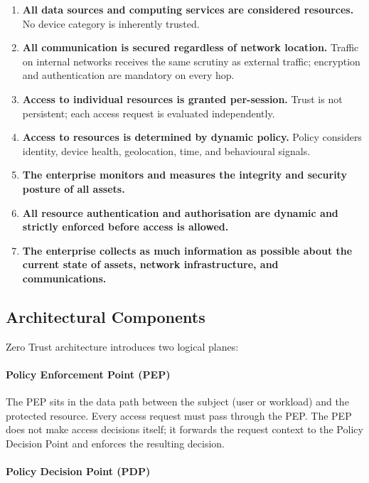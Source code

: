 \begin{enumerate}
    \item \textbf{All data sources and computing services are considered resources.} No device category is inherently trusted.
    \item \textbf{All communication is secured regardless of network location.} Traffic on internal networks receives the same scrutiny as external traffic; encryption and authentication are mandatory on every hop.
    \item \textbf{Access to individual resources is granted per-session.} Trust is not persistent; each access request is evaluated independently.
    \item \textbf{Access to resources is determined by dynamic policy.} Policy considers identity, device health, geolocation, time, and behavioural signals.
    \item \textbf{The enterprise monitors and measures the integrity and security posture of all assets.}
    \item \textbf{All resource authentication and authorisation are dynamic and strictly enforced before access is allowed.}
    \item \textbf{The enterprise collects as much information as possible about the current state of assets, network infrastructure, and communications.}
\end{enumerate}

\subsection{Architectural Components}

Zero Trust architecture introduces two logical planes:

\paragraph{Policy Enforcement Point (PEP)}

The PEP sits in the data path between the subject (user or workload) and the protected resource. Every access request must pass through the PEP. The PEP does not make access decisions itself; it forwards the request context to the Policy Decision Point and enforces the resulting decision.

\paragraph{Policy Decision Point (PDP)}

